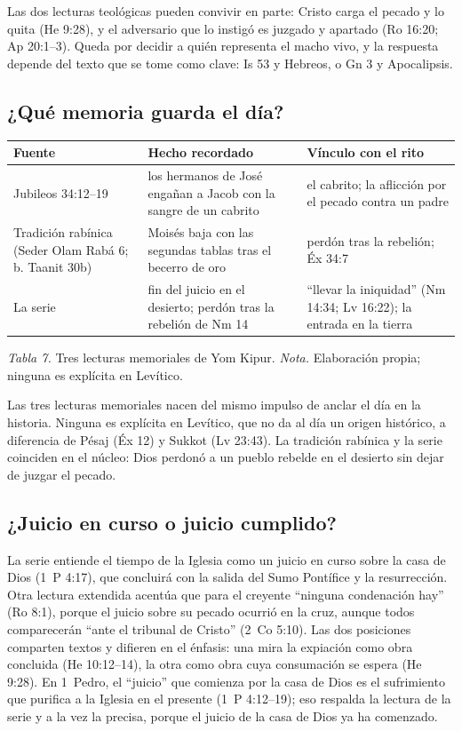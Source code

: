 \documentclass[11pt,letterpaper]{article}
\begin{document}
Las dos lecturas teológicas pueden convivir en parte: Cristo carga el pecado y lo quita (He 9:28), y el adversario que lo instigó es juzgado y apartado (Ro 16:20; Ap 20:1--3). Queda por decidir a quién representa el macho vivo, y la respuesta depende del texto que se tome como clave: Is 53 y Hebreos, o Gn 3 y Apocalipsis.

\subsection{¿Qué memoria guarda el día?}
\begin{center}\small\renewcommand{\arraystretch}{1.2}
\begin{tabular}{@{}L{3.6cm}L{5.4cm}L{5.6cm}@{}}
\toprule
\textbf{Fuente} & \textbf{Hecho recordado} & \textbf{Vínculo con el rito} \\ \midrule
Jubileos 34:12--19 & los hermanos de José engañan a Jacob con la sangre de un cabrito & el cabrito; la aflicción por el pecado contra un padre \\
Tradición rabínica (Seder Olam Rabá 6; b. Taanit 30b) & Moisés baja con las segundas tablas tras el becerro de oro & perdón tras la rebelión; Éx 34:7 \\
La serie & fin del juicio en el desierto; perdón tras la rebelión de Nm 14 & ``llevar la iniquidad'' (Nm 14:34; Lv 16:22); la entrada en la tierra \\
\bottomrule
\end{tabular}\par
{\footnotesize\color{sepia}\textit{Tabla 7.} Tres lecturas memoriales de Yom Kipur. \textit{Nota.} Elaboración propia; ninguna es explícita en Levítico.}
\end{center}

Las tres lecturas memoriales nacen del mismo impulso de anclar el día en la historia. Ninguna es explícita en Levítico, que no da al día un origen histórico, a diferencia de Pésaj (Éx 12) y Sukkot (Lv 23:43). La tradición rabínica y la serie coinciden en el núcleo: Dios perdonó a un pueblo rebelde en el desierto sin dejar de juzgar el pecado.

\subsection{¿Juicio en curso o juicio cumplido?}
La serie entiende el tiempo de la Iglesia como un juicio en curso sobre la casa de Dios (1~P 4:17), que concluirá con la salida del Sumo Pontífice y la resurrección. Otra lectura extendida acentúa que para el creyente ``ninguna condenación hay'' (Ro 8:1), porque el juicio sobre su pecado ocurrió en la cruz, aunque todos comparecerán ``ante el tribunal de Cristo'' (2~Co 5:10). Las dos posiciones comparten textos y difieren en el énfasis: una mira la expiación como obra concluida (He 10:12--14), la otra como obra cuya consumación se espera (He 9:28). En 1~Pedro, el ``juicio'' que comienza por la casa de Dios es el sufrimiento que purifica a la Iglesia en el presente (1~P 4:12--19); eso respalda la lectura de la serie y a la vez la precisa, porque el juicio de la casa de Dios ya ha comenzado.
\end{document}
